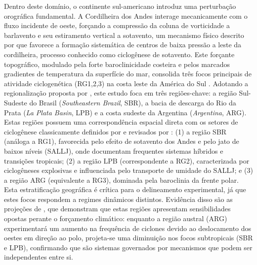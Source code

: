 Dentro deste domínio, o continente sul-americano introduz uma perturbação orográfica fundamental. A Cordilheira dos Andes interage mecanicamente com o fluxo incidente de oeste, forçando a compressão da coluna de vorticidade a barlavento e seu estiramento vertical a sotavento, um mecanismo físico descrito por \citet{gan1994influence} que favorece a formação sistemática de centros de baixa pressão a leste da cordilheira, processo conhecido como ciclogênese de sotavento.
Este forçante topográfico, modulado pela forte baroclinicidade costeira e pelos marcados gradientes de temperatura da superfície do mar, consolida três focos principais de atividade ciclogenética (RG1,2,3) na costa leste da América do Sul \citep{reboita2026meteorology}. Adotando a regionalização proposta por \citet{gramcianinov2019properties}, este estudo foca em três regiões-chave: a região Sul-Sudeste do Brasil (\textit{Southeastern Brazil}, SBR), a bacia de descarga do Rio da Prata (\textit{La Plata Basin}, LPB) e a costa sudeste da Argentina (\textit{Argentina}, ARG). Estas regiões possuem uma correspondência espacial direta com os setores de ciclogênese classicamente definidos por \citet{reboita2010cyclones} e revisados por \citet{reboita2026meteorology}: (1) a região SBR (análoga a RG1), favorecida pelo efeito de sotavento dos Andes e pelo jato de baixos níveis (SALLJ), onde \citet{reboita2022from} documentam frequentes sistemas híbridos e transições tropicais; (2) a região LPB (correspondente a RG2), caracterizada por ciclogêneses explosivas e influenciada pelo transporte de umidade do SALLJ; e (3) a região ARG (equivalente a RG3), dominada pela baroclinia da frente polar.
Esta estratificação geográfica é crítica para o delineamento experimental, já que estes focos respondem a regimes dinâmicos distintos. Evidência disso são as projeções de \citet{dejesus2021multimodel}, que demonstram que estas regiões apresentam sensibilidades opostas perante o forçamento climático: enquanto a região austral (ARG) experimentará um aumento na frequência de ciclones devido ao deslocamento dos oestes em direção ao polo, projeta-se uma diminuição nos focos subtropicais (SBR e LPB), confirmando que são sistemas governados por mecanismos que podem ser independentes entre si.

